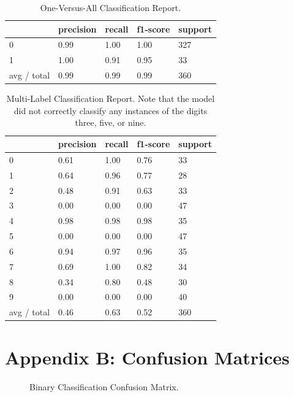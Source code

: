 \documentclass[]{article}
\begin{document}
\begin{table}[h]
	\begin{tabular}{l|llll}
		& precision & recall & f1-score & support \\ \hline
		0 & 0.99 & 1.00 & 1.00 & 327 \\
		1 & 1.00 & 0.91 & 0.95 & 33  \\
		avg / total & 0.99 & 0.99 & 0.99 & 360 
	\end{tabular}
	\caption{One-Versus-All Classification Report.}
\end{table}

\begin{table}[h]
	\begin{tabular}{l|llll}
		& precision & recall & f1-score & support \\ \hline
		0 & 0.61 & 1.00 & 0.76 & 33 \\
		1 & 0.64 & 0.96 & 0.77 & 28 \\
		2 & 0.48 & 0.91 & 0.63 & 33 \\
		3 & 0.00 & 0.00 & 0.00 & 47 \\
		4 & 0.98 & 0.98 & 0.98 & 35 \\
		5 & 0.00 & 0.00 & 0.00 & 47 \\
		6 & 0.94 & 0.97 & 0.96 & 35 \\
		7 & 0.69 & 1.00 & 0.82 & 34 \\
		8 & 0.34 & 0.80 & 0.48 & 30 \\
		9 & 0.00 & 0.00 & 0.00 & 40 \\
		avg / total & 0.46 & 0.63 & 0.52 & 360
	\end{tabular}
	\caption{Multi-Label Classification Report. Note that the model did not correctly classify any instances of the digits three, five, or nine.}
\end{table}

\newpage
\section*{Appendix B: Confusion Matrices}

\begin{figure}[h!]
	\centering
	\caption{Binary Classification Confusion Matrix.}
\end{figure}
\end{document}
